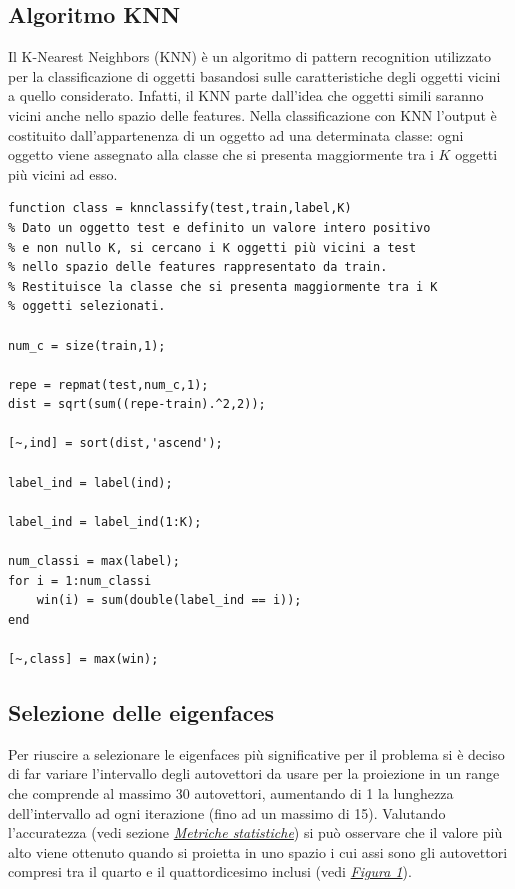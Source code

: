 \documentclass[12pt]{article}
\begin{document}
\subsection{Algoritmo KNN}
Il K-Nearest Neighbors (KNN) è un algoritmo di pattern recognition utilizzato per la classificazione di oggetti basandosi sulle caratteristiche degli oggetti vicini a quello considerato. Infatti, il KNN parte dall'idea che oggetti simili saranno vicini anche nello spazio delle features. Nella classificazione con KNN l'output è costituito dall'appartenenza di un oggetto ad una determinata classe: ogni oggetto viene assegnato alla classe che si presenta maggiormente tra i $K$ oggetti più vicini ad esso.
\begin{verbatim}
function class = knnclassify(test,train,label,K)
% Dato un oggetto test e definito un valore intero positivo
% e non nullo K, si cercano i K oggetti più vicini a test
% nello spazio delle features rappresentato da train.
% Restituisce la classe che si presenta maggiormente tra i K
% oggetti selezionati.

num_c = size(train,1);

repe = repmat(test,num_c,1);
dist = sqrt(sum((repe-train).^2,2));

[~,ind] = sort(dist,'ascend');

label_ind = label(ind);

label_ind = label_ind(1:K);

num_classi = max(label);
for i = 1:num_classi
    win(i) = sum(double(label_ind == i));
end

[~,class] = max(win);
\end{verbatim}

\subsection{Selezione delle eigenfaces}
Per riuscire a selezionare le eigenfaces più significative per il problema si è deciso di far variare l'intervallo degli autovettori da usare per la proiezione in un range che comprende al massimo 30 autovettori, aumentando di 1 la lunghezza dell'intervallo ad ogni iterazione (fino ad un massimo di 15). Valutando l'accuratezza (vedi sezione \hyperref[acc]{\textit{Metriche statistiche}}) si può osservare che il valore più alto viene ottenuto quando si proietta in uno spazio i cui assi sono gli autovettori compresi tra il quarto e il quattordicesimo inclusi (vedi \hyperref[fig1]{\textit{Figura 1}}).
\end{document}
